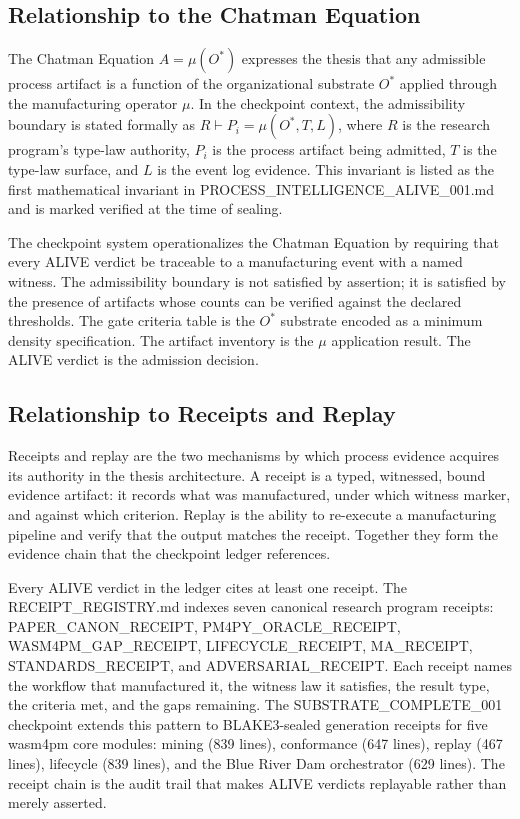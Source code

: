 \subsection{Relationship to the Chatman Equation}
\label{sec:checkpoints-lineage-chatman-equation}

The Chatman Equation $A = \mu(O^{*})$ expresses the thesis that any admissible process artifact is a
function of the organizational substrate $O^{*}$ applied through the manufacturing operator $\mu$.
In the checkpoint context, the admissibility boundary is stated formally as $R \vdash P_i = \mu(O^*, T, L)$,
where $R$ is the research program's type-law authority, $P_i$ is the process artifact being admitted,
$T$ is the type-law surface, and $L$ is the event log evidence. This invariant is listed as the first
mathematical invariant in PROCESS\_INTELLIGENCE\_ALIVE\_001.md and is marked verified at the time of
sealing.

The checkpoint system operationalizes the Chatman Equation by requiring that every ALIVE verdict be
traceable to a manufacturing event with a named witness. The admissibility boundary is not satisfied
by assertion; it is satisfied by the presence of artifacts whose counts can be verified against the
declared thresholds. The gate criteria table is the $O^{*}$ substrate encoded as a minimum density
specification. The artifact inventory is the $\mu$ application result. The ALIVE verdict is the
admission decision.

\subsection{Relationship to Receipts and Replay}
\label{sec:checkpoints-lineage-receipts-replay}

Receipts and replay are the two mechanisms by which process evidence acquires its authority in the
thesis architecture. A receipt is a typed, witnessed, bound evidence artifact: it records what was
manufactured, under which witness marker, and against which criterion. Replay is the ability to
re-execute a manufacturing pipeline and verify that the output matches the receipt. Together they form
the evidence chain that the checkpoint ledger references.

Every ALIVE verdict in the ledger cites at least one receipt. The RECEIPT\_REGISTRY.md indexes seven
canonical research program receipts: PAPER\_CANON\_RECEIPT, PM4PY\_ORACLE\_RECEIPT,
WASM4PM\_GAP\_RECEIPT, LIFECYCLE\_RECEIPT, MA\_RECEIPT, STANDARDS\_RECEIPT, and
ADVERSARIAL\_RECEIPT. Each receipt names the workflow that manufactured it, the witness law it
satisfies, the result type, the criteria met, and the gaps remaining. The SUBSTRATE\_COMPLETE\_001
checkpoint extends this pattern to BLAKE3-sealed generation receipts for five wasm4pm core modules:
mining (839 lines), conformance (647 lines), replay (467 lines), lifecycle (839 lines), and the Blue
River Dam orchestrator (629 lines). The receipt chain is the audit trail that makes ALIVE verdicts
replayable rather than merely asserted.

